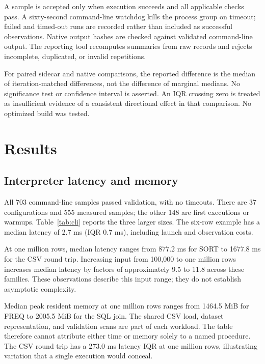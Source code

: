 \documentclass[11pt,a4paper]{article}
\begin{document}
A sample is accepted only when execution succeeds and all
applicable checks pass. A sixty-second command-line watchdog
kills the process group on timeout; failed and timed-out runs
are recorded rather than included as successful observations.
Native output hashes are checked against validated command-line
output. The reporting tool recomputes summaries from raw records
and rejects incomplete, duplicated, or invalid repetitions.

For paired sidecar and native comparisons, the reported
difference is the median of iteration-matched differences,
not the difference of marginal medians. No significance test
or confidence interval is asserted. An IQR crossing zero is
treated as insufficient evidence of a consistent directional
effect in that comparison. No optimized build was tested.

\section{Results}

\subsection{Interpreter latency and memory}

All 703 command-line samples passed validation, with no timeouts.
There are 37 configurations and 555 measured samples; the other
148 are first executions or warmups. Table~\ref{tab:cli} reports
the three larger sizes. The six-row example has a median latency
of 2.7 ms (IQR 0.7 ms), including launch and observation costs.

\begin{table}[tbp]
\centering
\small

\caption{Command-line median latency in milliseconds, with IQR
width in parentheses; fifteen measured repetitions per cell.
The last column is median peak resident memory in MiB at one
million rows. Sidecar output is disabled.}
\label{tab:cli}
\end{table}

At one million rows, median latency ranges from 877.2 ms for SORT
to 1677.8 ms for the CSV round trip. Increasing input from
100,000 to one million rows increases median latency by factors
of approximately 9.5 to 11.8 across these families. These
observations describe this input range; they do not establish
asymptotic complexity.

Median peak resident memory at one million rows ranges from
1464.5 MiB for FREQ to 2005.5 MiB for the SQL join. The shared
CSV load, dataset representation, and validation scans are part
of each workload. The table therefore cannot attribute either
time or memory solely to a named procedure. The CSV round trip
has a 273.0 ms latency IQR at one million rows, illustrating
variation that a single execution would conceal.
\end{document}
